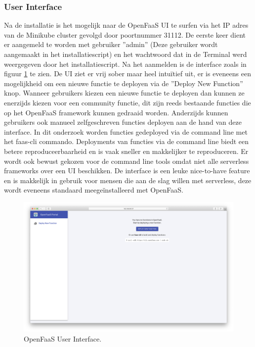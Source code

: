 \subsubsection{User Interface}
Na de installatie is het mogelijk naar de OpenFaaS UI te surfen via het IP adres van de Minikube cluster gevolgd door poortnummer 31112.
De eerste keer dient er aangemeld te worden met gebruiker ''admin'' (Deze gebruiker wordt aangemaakt in het installatiescript) en het wachtwoord dat in de Terminal werd weergegeven door het installatiescript. Na het aanmelden is de interface zoals in figuur \ref{fig:openfaas-ui} te zien. De UI ziet er vrij sober maar heel intuïtief uit, er is eveneens een mogelijkheid om een nieuwe functie te deployen via de ''Deploy New Function'' knop. Wanneer gebruikers kiezen een nieuwe functie te deployen dan kunnen ze enerzijds kiezen voor een community functie, dit zijn reeds bestaande functies die op het OpenFaaS framework kunnen gedraaid worden. Anderzijds kunnen gebruikers ook manueel zelfgeschreven functies deployen aan de hand van deze interface. In dit onderzoek worden functies gedeployed via de command line met het faas-cli commando. Deployments van functies via de command line biedt een betere reproduceerbaarheid en is vaak sneller en makkelijker te reproduceren. Er wordt ook bewust gekozen voor de command line tools omdat niet alle serverless frameworks over een UI beschikken. De interface is een leuke nice-to-have feature en is makkelijk in gebruik voor mensen die aan de slag willen met serverless, deze wordt eveneens standaard meegeïnstalleerd met OpenFaaS.
\begin{figure}
    \includegraphics[width=1\textwidth]{img/openfaas-ui.png}
    \caption{OpenFaaS User Interface.}
    \label{fig:openfaas-ui}  
\end{figure}

